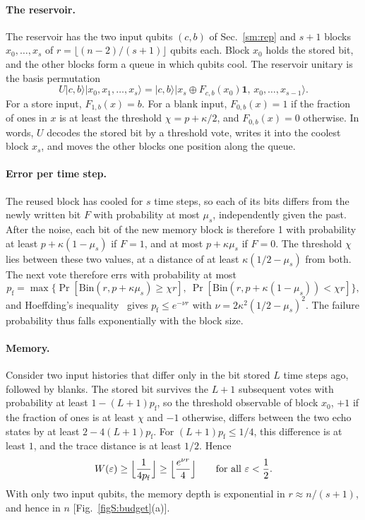 \documentclass[aps,prl,twocolumn,superscriptaddress,floatfix]{revtex4-2}
\theoremstyle{plain}
\newcommand{\ket}[1]{|#1\rangle}
\begin{document}
\paragraph*{The reservoir.} The reservoir has the two input qubits $(c,b)$ of Sec.~\ref{sm:rep} and $s+1$ blocks $x_0,\dots,x_s$ of $r=\lfloor(n-2)/(s+1)\rfloor$ qubits each. Block $x_0$ holds the stored bit, and the other blocks form a queue in which qubits cool. The reservoir unitary is the basis permutation
\begin{equation}
U\ket{c,b}\ket{x_0,x_1,\dots,x_s}=\ket{c,b}\ket{x_s\oplus F_{c,b}(x_0)\bm1,\,x_0,\dots,x_{s-1}} .
\end{equation}
For a store input, $F_{1,b}(x)=b$. For a blank input, $F_{0,b}(x)=1$ if the fraction of ones in $x$ is at least the threshold $\chi=p+\kappa/2$, and $F_{0,b}(x)=0$ otherwise. In words, $U$ decodes the stored bit by a threshold vote, writes it into the coolest block $x_s$, and moves the other blocks one position along the queue.

\paragraph*{Error per time step.} The reused block has cooled for $s$ time steps, so each of its bits differs from the newly written bit $F$ with probability at most $\mu_s$, independently given the past. After the noise, each bit of the new memory block is therefore 1 with probability at least $p+\kappa(1-\mu_s)$ if $F=1$, and at most $p+\kappa\mu_s$ if $F=0$. The threshold $\chi$ lies between these two values, at a distance of at least $\kappa(1/2-\mu_s)$ from both. The next vote therefore errs with probability at most
\begin{equation}
p_{\mathrm f}=\max\bigl\{\Pr[\mathrm{Bin}(r,p+\kappa\mu_s)\ge\chi r],\ \Pr[\mathrm{Bin}(r,p+\kappa(1-\mu_s))<\chi r]\bigr\},
\end{equation}
and Hoeffding's inequality~\cite{Hoeffding1963} gives $p_{\mathrm f}\le e^{-\nu r}$ with $\nu=2\kappa^2(1/2-\mu_s)^2$. The failure probability thus falls exponentially with the block size.

\paragraph*{Memory.} Consider two input histories that differ only in the bit stored $L$ time steps ago, followed by blanks. The stored bit survives the $L+1$ subsequent votes with probability at least $1-(L+1)p_{\mathrm f}$, so the threshold observable of block $x_0$, $+1$ if the fraction of ones is at least $\chi$ and $-1$ otherwise, differs between the two echo states by at least $2-4(L+1)p_{\mathrm f}$. For $(L+1)p_{\mathrm f}\le1/4$, this difference is at least $1$, and the trace distance is at least $1/2$. Hence
\begin{equation}
W(\varepsilon)\ge\Bigl\lfloor\frac1{4p_{\mathrm f}}\Bigr\rfloor\ge\Bigl\lfloor\frac{e^{\nu r}}4\Bigr\rfloor\qquad\text{for all }\varepsilon<\frac12 .
\end{equation}
With only two input qubits, the memory depth is exponential in $r\approx n/(s+1)$, and hence in $n$ [Fig.~\ref{figS:budget}(a)].
\end{document}
